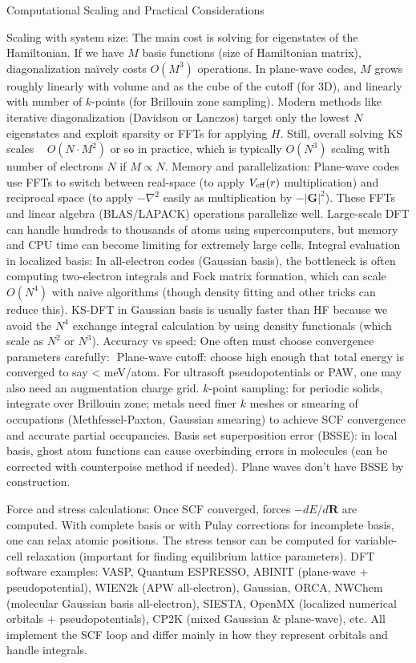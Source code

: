 \begin{frame}{Computational Scaling and Practical Considerations}

Scaling with system size: The main cost is solving for eigenstates of the Hamiltonian. If we have $M$ basis functions (size of Hamiltonian matrix), diagonalization naïvely costs $O(M^3)$ operations. In plane-wave codes, $M$ grows roughly linearly with volume and as the cube of the cutoff (for 3D), and linearly with number of $k$-points (for Brillouin zone sampling). Modern methods like iterative diagonalization (Davidson or Lanczos) target only the lowest $N$ eigenstates and exploit sparsity or FFTs for applying $H$. Still, overall solving KS scales ~ $O(N \cdot M^2)$ or so in practice, which is typically $O(N^3)$ scaling with number of electrons $N$ if $M \propto N$.
Memory and parallelization: Plane-wave codes use FFTs to switch between real-space (to apply $V_{\rm eff}(r)$ multiplication) and reciprocal space (to apply $-\nabla^2$ easily as multiplication by $-|\mathbf{G}|^2$). These FFTs and linear algebra (BLAS/LAPACK) operations parallelize well. Large-scale DFT can handle hundreds to thousands of atoms using supercomputers, but memory and CPU time can become limiting for extremely large cells.
Integral evaluation in localized basis: In all-electron codes (Gaussian basis), the bottleneck is often computing two-electron integrals and Fock matrix formation, which can scale $O(N^4)$ with naive algorithms (though density fitting and other tricks can reduce this). KS-DFT in Gaussian basis is usually faster than HF because we avoid the $N^4$ exchange integral calculation by using density functionals (which scale as $N^2$ or $N^3$).
Accuracy vs speed: One often must choose convergence parameters carefully: 
Plane-wave cutoff: choose high enough that total energy is converged to say < meV/atom. For ultrasoft pseudopotentials or PAW, one may also need an augmentation charge grid.
$k$-point sampling: for periodic solids, integrate over Brillouin zone; metals need finer $k$ meshes or smearing of occupations (Methfessel-Paxton, Gaussian smearing) to achieve SCF convergence and accurate partial occupancies.
Basis set superposition error (BSSE): in local basis, ghost atom functions can cause overbinding errors in molecules (can be corrected with counterpoise method if needed). Plane waves don’t have BSSE by construction.

Force and stress calculations: Once SCF converged, forces $-dE/d\mathbf{R}$ are computed. With complete basis or with Pulay corrections for incomplete basis, one can relax atomic positions. The stress tensor can be computed for variable-cell relaxation (important for finding equilibrium lattice parameters).
DFT software examples: VASP, Quantum ESPRESSO, ABINIT (plane-wave + pseudopotential), WIEN2k (APW all-electron), Gaussian, ORCA, NWChem (molecular Gaussian basis all-electron), SIESTA, OpenMX (localized numerical orbitals + pseudopotentials), CP2K (mixed Gaussian & plane-wave), etc. All implement the SCF loop and differ mainly in how they represent orbitals and handle integrals. \end{frame}


